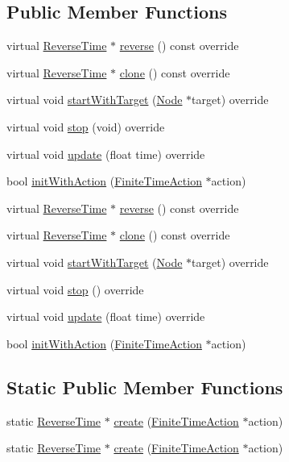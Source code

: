 \subsection*{Public Member Functions}
\begin{DoxyCompactItemize}
\item 
virtual \hyperlink{classReverseTime}{Reverse\+Time} $\ast$ \hyperlink{classReverseTime_a191b205600fcebbc7b0a5101bcef9a7d}{reverse} () const override
\item 
virtual \hyperlink{classReverseTime}{Reverse\+Time} $\ast$ \hyperlink{classReverseTime_a5bbbb233eb04b5392365ef294260e5db}{clone} () const override
\item 
virtual void \hyperlink{classReverseTime_a5872b14aa6f27a0f76bc5542da183b53}{start\+With\+Target} (\hyperlink{classNode}{Node} $\ast$target) override
\item 
virtual void \hyperlink{classReverseTime_af59bd73c03add3be189a371f5f338b72}{stop} (void) override
\item 
virtual void \hyperlink{classReverseTime_a7a321c5c5d148b4e9d718ba67c974297}{update} (float time) override
\item 
bool \hyperlink{classReverseTime_ae1bcb66b1fa2a6eee710e241ff8872b9}{init\+With\+Action} (\hyperlink{classFiniteTimeAction}{Finite\+Time\+Action} $\ast$action)
\item 
virtual \hyperlink{classReverseTime}{Reverse\+Time} $\ast$ \hyperlink{classReverseTime_af793780e6f99198c1ae1dff33a8b0d25}{reverse} () const override
\item 
virtual \hyperlink{classReverseTime}{Reverse\+Time} $\ast$ \hyperlink{classReverseTime_a371059f58fcb15afad93de0caa385f87}{clone} () const override
\item 
virtual void \hyperlink{classReverseTime_affe557858b9401f25a00e9edb70738d6}{start\+With\+Target} (\hyperlink{classNode}{Node} $\ast$target) override
\item 
virtual void \hyperlink{classReverseTime_ab4fbd1a9abd412981366ae8a7782180e}{stop} () override
\item 
virtual void \hyperlink{classReverseTime_a362f5b46a1b2e1a9b2ce8a59df1dca97}{update} (float time) override
\item 
bool \hyperlink{classReverseTime_ae1bcb66b1fa2a6eee710e241ff8872b9}{init\+With\+Action} (\hyperlink{classFiniteTimeAction}{Finite\+Time\+Action} $\ast$action)
\end{DoxyCompactItemize}
\subsection*{Static Public Member Functions}
\begin{DoxyCompactItemize}
\item 
static \hyperlink{classReverseTime}{Reverse\+Time} $\ast$ \hyperlink{classReverseTime_a344d6bce651a1d8ca82314b9763ae8df}{create} (\hyperlink{classFiniteTimeAction}{Finite\+Time\+Action} $\ast$action)
\item 
static \hyperlink{classReverseTime}{Reverse\+Time} $\ast$ \hyperlink{classReverseTime_acb56561704925e0ce3aa059ba2f85bf0}{create} (\hyperlink{classFiniteTimeAction}{Finite\+Time\+Action} $\ast$action)
\end{DoxyCompactItemize}
